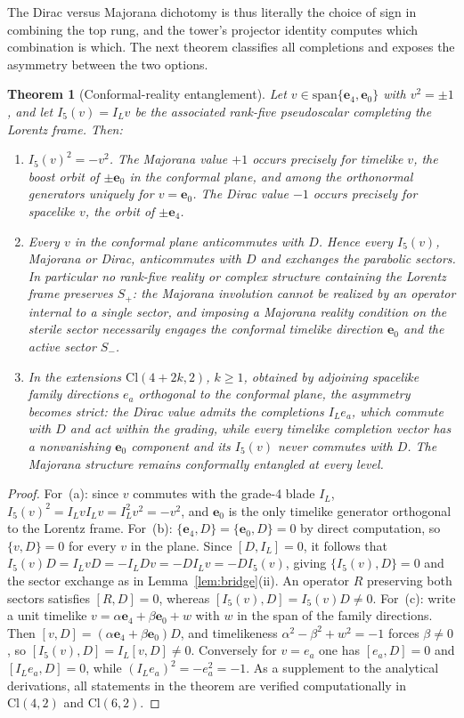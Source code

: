 \documentclass{birkjour}
\newtheorem{thm}{Theorem}[section]
\theoremstyle{definition}
\theoremstyle{remark}
\numberwithin{equation}{section}
\newcommand{\Cl}{\mathrm{Cl}}
\newcommand{\e}[1]{\bm{e}_{#1}}
\newenvironment{revblock}{}{}
\begin{document}
\begin{revblock}
The Dirac versus Majorana dichotomy is thus literally the
choice of sign in combining the top rung, and the tower's
projector identity computes which combination is which.
The next theorem classifies all completions and exposes the
asymmetry between the two options.

\begin{thm}[Conformal-reality entanglement]\label{thm:entangle}
Let $v\in\mathrm{span}\{\e{4},\e{0}\}$ with $v^2=\pm1$, and
let $I_5(v)=I_Lv$ be the associated rank-five pseudoscalar
completing the Lorentz frame. Then:
\begin{enumerate}[label=\textup{(\alph*)}]
\item $I_5(v)^2=-v^2$. The Majorana value $+1$ occurs
precisely for timelike $v$, the boost orbit of $\pm\e{0}$
in the conformal plane, and among the orthonormal
generators uniquely for $v=\e{0}$. The Dirac value $-1$
occurs precisely for spacelike $v$, the orbit of
$\pm\e{4}$.
\item Every $v$ in the conformal plane anticommutes with
$D$. Hence every $I_5(v)$, Majorana or Dirac, anticommutes
with $D$ and exchanges the parabolic sectors. In particular
no rank-five reality or complex structure containing the
Lorentz frame preserves $S_+$: the Majorana involution
cannot be realized by an operator internal to a single
sector, and imposing a Majorana reality condition on the
sterile sector necessarily engages the conformal timelike
direction $\e{0}$ and the active sector $S_-$.
\item In the extensions $\Cl(4+2k,2)$, $k\geq1$, obtained
by adjoining spacelike family directions $e_a$ orthogonal
to the conformal plane, the asymmetry becomes strict: the
Dirac value admits the completions $I_Le_a$, which commute
with $D$ and act within the grading, while every timelike
completion vector has a nonvanishing $\e{0}$ component and
its $I_5(v)$ never commutes with $D$. The Majorana
structure remains conformally entangled at every level.
\end{enumerate}
\end{thm}

\begin{proof}
For~(a): since $v$ commutes with the grade-4 blade $I_L$,
$I_5(v)^2=I_LvI_Lv=I_L^2v^2=-v^2$, and $\e{0}$ is the only
timelike generator orthogonal to the Lorentz frame.
For~(b): $\{\e{4},D\}=\{\e{0},D\}=0$ by direct computation,
so $\{v,D\}=0$ for every $v$ in the plane. Since
$[D,I_L]=0$, it follows that
$I_5(v)D=I_LvD=-I_LDv=-DI_Lv=-DI_5(v)$, giving
$\{I_5(v),D\}=0$ and the sector exchange as in
Lemma~\ref{lem:bridge}(ii). An operator $R$ preserving both
sectors satisfies $[R,D]=0$, whereas
$[I_5(v),D]=I_5(v)D\neq0$.
For~(c): write a unit timelike $v=\alpha\e{4}+\beta\e{0}+w$
with $w$ in the span of the family directions. Then
$[v,D]=(\alpha\e{4}+\beta\e{0})D$, and timelikeness
$\alpha^2-\beta^2+w^2=-1$ forces $\beta\neq0$, so
$[I_5(v),D]=I_L[v,D]\neq0$. Conversely for $v=e_a$ one has
$[e_a,D]=0$ and $[I_L e_a,D]=0$, while
$(I_Le_a)^2=-e_a^2=-1$. As a supplement to the analytical
derivations, all statements in the theorem are verified
computationally in $\Cl(4,2)$ and $\Cl(6,2)$.
\end{proof}


\end{revblock}
\end{document}
